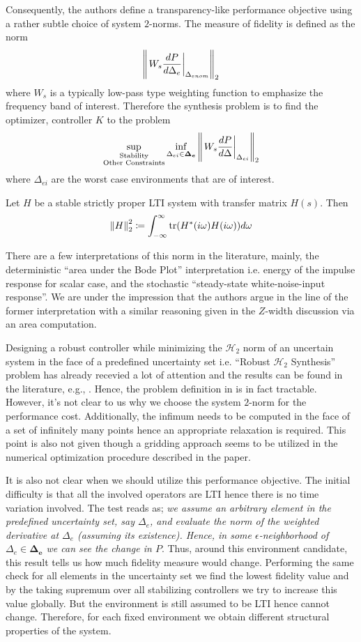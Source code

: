 Consequently, the authors define a transparency-like performance objective using a rather subtle choice of system $2$-norms. 
The measure of fidelity is defined as the norm
\[
\displaystyle \left\| \left.W_s\frac{dP}{d\Delta_e}\right|_{\Delta_{enom}} \right\|_2
\]
where $W_s$ is a typically low-pass type weighting function to emphasize the frequency band of interest. Therefore
the synthesis problem is to find the optimizer, controller $K$ to the problem
\[
\sup_{\substack{\text{Stability}\\\text{Other Constraints}}}\inf_{\Delta_{ei}\in\bm{\Delta_e}}
\displaystyle \left\| \left.W_s\frac{dP}{d\Delta}\right|_{\Delta_{ei}} \right\|_2
\]
where $\Delta_{ei}$ are the worst case environments that are of interest.

\begin{define*}Let $H$ be a stable strictly proper LTI system with transfer matrix $H(s)$. Then 
\[
\displaystyle \left\| H \right\|_2^2 \coloneqq \int_{-\infty}^\infty{\operatorname{tr}(H^*(i\omega)H(i\omega))}d\omega
\] 
\end{define*}

There are a few interpretations of this norm in the literature, mainly, the deterministic \enquote{area under the Bode
Plot} interpretation i.e. energy of the impulse response for scalar case, and the stochastic \enquote{steady-state 
white-noise-input response}. We are under the impression that the authors argue in the line of the former interpretation
with a similar reasoning given in the $Z$-width discussion via an area computation. 

Designing a robust controller while minimizing the $\mathcal{H}_2$ norm of an uncertain system in the face of a predefined 
uncertainty set i.e. \enquote{Robust $\mathcal{H}_2$ Synthesis} problem has already recevied a lot of attention and 
the results can be found in the literature, e.g., \cite{dullerud}. Hence, the problem definition in \cite{cavusoglu} is 
in fact tractable. However, it's not clear to us why we choose the system $2$-norm for the performance cost. Additionally, 
the infimum needs to be computed in the face of a set of infinitely many points hence an appropriate relaxation is required. 
This point is also not given though a gridding approach seems to be utilized in the numerical optimization procedure 
described in the paper.

It is also not clear when we should utilize this performance objective. The initial difficulty is that all the 
involved operators are LTI hence there is no time variation involved. The test reads as; \emph{we assume an arbitrary element 
in the predefined uncertainty set, say $\Delta_e$, and evaluate the norm of the weighted derivative at $\Delta_e$ (assuming its 
existence). Hence, in some $\epsilon$-neighborhood of $\Delta_e\in\bm{\Delta_e}$ we can see the change in $P$}. Thus, around this environment 
candidate, this result tells us how much fidelity measure would change. Performing the same check for all elements in the uncertainty
set we find the lowest fidelity value and by the taking supremum over all stabilizing controllers we try to increase this value globally. 
But the environment is still assumed to be LTI hence cannot change. Therefore, for each fixed environment we obtain different structural 
properties of the system. 

